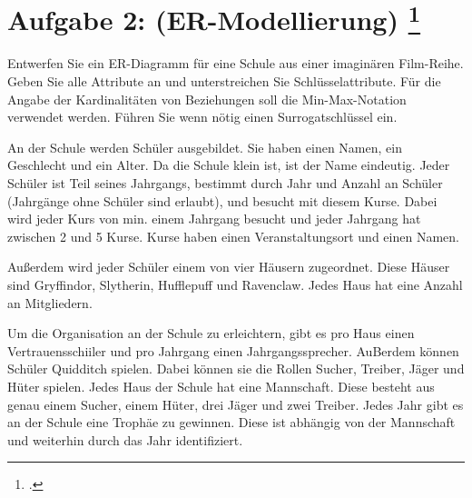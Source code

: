 \documentclass{lehramt-informatik-aufgabe}
\begin{document}
\section{Aufgabe 2: (ER-Modellierung)
\footcite[Thema 1 Teilaufgabe 2 Aufgabe 2]{examen:66116:2019:09}
}

Entwerfen Sie ein ER-Diagramm für eine Schule aus einer imaginären
Film-Reihe. Geben Sie alle Attribute an und unterstreichen Sie
Schlüsselattribute. Für die Angabe der Kardinalitäten von Beziehungen
soll die Min-Max-Notation verwendet werden. Führen Sie wenn nötig einen
Surrogatschlüssel ein.

An der Schule werden Schüler ausgebildet. Sie haben einen Namen, ein
Geschlecht und ein Alter. Da die Schule klein ist, ist der Name
eindeutig. Jeder Schüler ist Teil seines Jahrgangs, bestimmt durch Jahr
und Anzahl an Schüler (Jahrgänge ohne Schüler sind erlaubt), und besucht
mit diesem Kurse. Dabei wird jeder Kurs von min. einem Jahrgang besucht
und jeder Jahrgang hat zwischen 2 und 5 Kurse. Kurse haben einen
Veranstaltungsort und einen Namen.

Außerdem wird jeder Schüler einem von vier Häusern zugeordnet. Diese
Häuser sind Gryffindor, Slytherin, Hufflepuff und Ravenclaw. Jedes Haus
hat eine Anzahl an Mitgliedern.

Um die Organisation an der Schule zu erleichtern, gibt es pro Haus einen
Vertrauensschiiler und pro Jahrgang einen Jahrgangssprecher. AuBerdem
können Schüler Quidditch spielen. Dabei können sie die Rollen Sucher,
Treiber, Jäger und Hüter spielen. Jedes Haus der Schule hat eine
Mannschaft. Diese besteht aus genau einem Sucher, einem Hüter, drei
Jäger und zwei Treiber. Jedes Jahr gibt es an der Schule eine Trophäe zu
gewinnen. Diese ist abhängig von der Mannschaft und weiterhin durch das
Jahr identifiziert.
\end{document}
